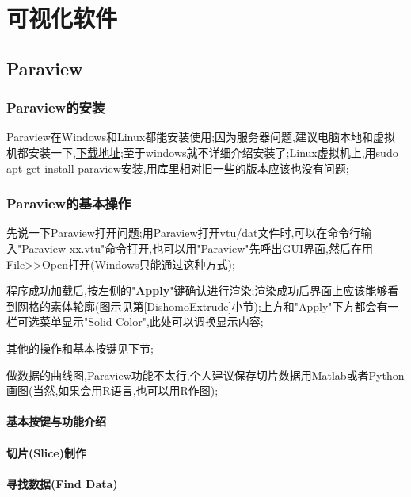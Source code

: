 \chapter{可视化软件}
\section{Paraview}

\subsection{Paraview的安装}
Paraview在Windows和Linux都能安装使用;因为服务器问题,建议电脑本地和虚拟机都安装一下,\href{https://www.paraview.org/download/}{下载地址};至于windows就不详细介绍安装了;Linux虚拟机上,用sudo apt-get install paraview安装,用库里相对旧一些的版本应该也没有问题;

\subsection{Paraview的基本操作} \label{Parabasis}
先说一下Paraview打开问题;用Paraview打开vtu/dat文件时,可以在命令行输入"Paraview xx.vtu"命令打开,也可以用"Paraview"先呼出GUI界面,然后在用File>>Open打开(Windows只能通过这种方式);
\par
程序成功加载后,按左侧的"\textbf{Apply}"键确认进行渲染;渲染成功后界面上应该能够看到网格的素体轮廓(图示见第\ref{DishomoExtrude}小节);上方和"Apply"下方都会有一栏可选菜单显示"Solid Color",此处可以调换显示内容;\par

其他的操作和基本按键见下节;\par

做数据的曲线图,Paraview功能不太行,个人建议保存切片数据用Matlab或者Python画图(当然,如果会用R语言,也可以用R作图);

\subsubsection{基本按键与功能介绍}


\subsubsection{切片(Slice)制作}



\subsubsection{寻找数据(Find Data)}


